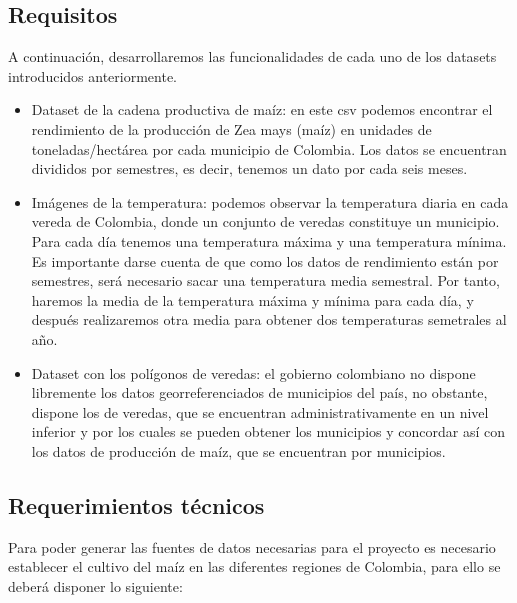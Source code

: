 \documentclass[12pt, spanish]{article}
\begin{document}
\newpage

\subsection{Requisitos}

A continuación, desarrollaremos las funcionalidades de cada uno de los datasets introducidos anteriormente.

\begin{itemize}
    \item Dataset de la cadena productiva de maíz: en este csv podemos encontrar el rendimiento de la producción de Zea mays (maíz) en unidades de toneladas/hectárea por cada municipio de Colombia. Los datos se encuentran divididos por semestres, es decir, tenemos un dato por cada seis meses.
    
    \item Imágenes de la temperatura: podemos observar la temperatura diaria en cada vereda de Colombia, donde un conjunto de veredas constituye un municipio. Para cada día tenemos una temperatura máxima y una temperatura mínima. Es importante darse cuenta de que como los datos de rendimiento están por semestres, será necesario sacar una temperatura media semestral. Por tanto, haremos la media de la temperatura máxima y mínima para cada día, y después realizaremos otra media para obtener dos temperaturas semetrales al año.
    
    \item Dataset con los polígonos de veredas: el gobierno colombiano no dispone libremente los datos georreferenciados de municipios del país, no obstante, dispone los de veredas, que se encuentran administrativamente en un nivel inferior y por los cuales se pueden obtener los municipios y concordar así con los datos de producción de maíz, que se encuentran por municipios.
\end{itemize}


\subsection{Requerimientos técnicos}
Para poder generar las fuentes de datos necesarias para el proyecto es necesario establecer el cultivo del maíz en las diferentes regiones de Colombia, para ello se deberá disponer lo siguiente:
\end{document}
